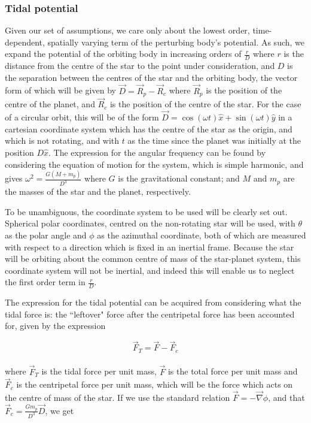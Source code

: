 \documentclass[11pt]{amsart}
\begin{document}
\subsubsection{Tidal potential}

Given our set of assumptions, we care only about the lowest order, time-dependent, spatially varying term of the
perturbing body's potential.  As such, we expand the potential of the orbiting body in increasing orders of $\frac{r}{D}$
where $r$ is the distance from the centre of the star to the point under consideration, and $D$ is the separation
between the centres of the star and the orbiting body, the vector form of which will be given by $\vec{D} = \vec{R}_{p} - \vec{R}_{c}$
where $\vec{R}_{p}$ is the position of the centre of the planet, and $\vec{R}_{c}$ is the position of the centre of the star.
For the case of a circular orbit, this will be of the form $\vec{D} = \cos (\omega t) \hat{x} + \sin (\omega t) \hat{y}$
in a cartesian coordinate system which has the centre of the star as the origin, and which is not rotating, and with $t$ as the time
since the planet was initially at the position $D \hat{x}$.  The expression
for the angular frequency can be found by considering the equation of motion for the system, which is simple harmonic, and gives
$\omega^{2} = \frac{G (M + m_{p})}{D^{3}}$ where $G$ is the gravitational constant; and $M$ and $m_{p}$ are the masses of the star and
the planet, respectively.

To be unambiguous, the coordinate system to be used will be clearly set out.  Spherical polar coordinates, centred on the
non-rotating star will be used, with $\theta$ as the polar angle and $\phi$ as the azimuthal coordinate, both of which are
measured with respect to a direction which is fixed in an inertial frame.  Because the star will be orbiting about the
common centre of mass of the star-planet system, this coordinate system will not be inertial, and indeed this will enable us
to neglect the first order term in $\frac{r}{D}$.

The expression for the tidal potential can be acquired from considering what the tidal force is:
the ``leftover" force after the centripetal force has been accounted for, given by the expression

\begin{equation}
\vec{F}_{T} = \vec{F} - \vec{F}_{c}
\end{equation}
\\
where $\vec{F}_{T}$ is the tidal force per unit mass, $\vec{F}$ is the total force per unit mass and $\vec{F}_{c}$ is the centripetal force per unit mass,
which will be the force which acts on the centre of mass of the star.  If we use the standard relation 
$\vec{F} = -  \vec{\nabla}\phi$, and that $\vec{F}_{c} = \frac{G m_{p}}{D^3} \vec{D}$, we get
\end{document}
